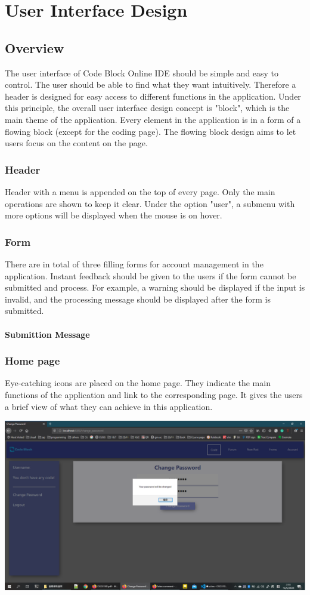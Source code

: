 \chapter{User Interface Design}
\section{Overview}
The user interface of Code Block Online IDE should be simple and easy to control. The user should be able to find what they want intuitively. Therefore a header is designed for easy access to different functions in the application. Under this principle, the overall user interface design concept is "block", which is the main theme of the application. Every element in the application is in a form of a flowing block (except for the coding page). The flowing block design aims to let users focus on the content on the page.

\subsection{Header}
Header with a menu is appended on the top of every page. Only the main operations are shown to keep it clear. Under the option "user", a submenu with more options will be displayed when the mouse is on hover.

\subsection{Form}
There are in total of three filling forms for account management in the application. Instant feedback should be given to the users if the form cannot be submitted and process. For example, a warning should be displayed if the input is invalid, and the processing message should be displayed after the form is submitted.
\subsubsection{Submittion Message}

\subsection{Home page}
Eye-catching icons are placed on the home page. They indicate the main functions of the application and link to the corresponding page. It gives the users a brief view of what they can achieve in this application.

\includegraphics[scale=0.45]{Doc/Pics/change_pw_sign.png}

